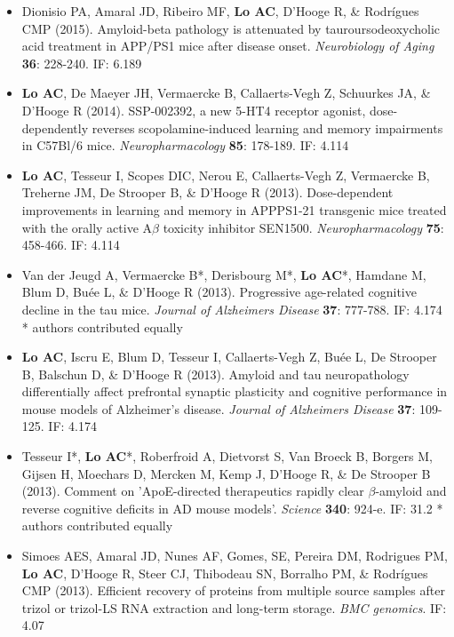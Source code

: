 \documentclass{article}
\begin{document}
\begin{itemize}
    \item Dionisio PA, Amaral JD, Ribeiro MF, \textbf{Lo AC}, D'Hooge R, \& Rodr\'{i}gues CMP (2015). Amyloid-beta pathology is attenuated by tauroursodeoxycholic acid treatment in APP/PS1 mice after disease onset. \emph{Neurobiology of Aging} \textbf{36}: 228-240. IF: 6.189
    
    \item \textbf{Lo AC}, De Maeyer JH, Vermaercke B, Callaerts-Vegh Z, Schuurkes JA, \& D'Hooge R (2014). SSP-002392, a new 5-HT4 receptor agonist, dose-dependently reverses scopolamine-induced learning and memory impairments in C57Bl/6 mice. \emph{Neuropharmacology} \textbf{85}: 178-189. IF: 4.114
    
    \item \textbf{Lo AC}, Tesseur I, Scopes DIC, Nerou E, Callaerts-Vegh Z, Vermaercke B, Treherne JM, De Strooper B, \& D'Hooge R (2013). Dose-dependent improvements in learning and memory in APPPS1-21 transgenic mice treated with the orally active A$\beta$  toxicity inhibitor SEN1500. \emph{Neuropharmacology} \textbf{75}: 458-466. IF: 4.114
    
    \item Van der Jeugd A, Vermaercke B*, Derisbourg M*, \textbf{Lo AC}*, Hamdane M, Blum D, Bu\'{e}e L, \& D'Hooge R (2013). Progressive age-related cognitive decline in the tau mice. \emph{Journal of Alzheimers Disease} \textbf{37}: 777-788. IF: 4.174 * authors contributed equally
    
    \item \textbf{Lo AC}, Iscru E, Blum D, Tesseur I, Callaerts-Vegh Z, Bu\'{e}e L, De Strooper B, Balschun D, \& D'Hooge R (2013). Amyloid and tau neuropathology differentially affect prefrontal synaptic plasticity and cognitive performance in mouse models of Alzheimer's disease. \emph{Journal of Alzheimers Disease} \textbf{37}: 109-125. IF: 4.174
    
    \item Tesseur I*, \textbf{Lo AC}*, Roberfroid A, Dietvorst S, Van Broeck B, Borgers M, Gijsen H, Moechars D, Mercken M, Kemp J, D'Hooge R, \& De Strooper B (2013). Comment on 'ApoE-directed therapeutics rapidly clear $\beta$-amyloid and reverse cognitive deficits in AD mouse models'. \emph{Science} \textbf{340}: 924-e. IF: 31.2 * authors contributed equally
    
    \item Simoes AES, Amaral JD, Nunes AF, Gomes, SE, Pereira DM, Rodrigues PM, \textbf{Lo AC}, D'Hooge R, Steer CJ, Thibodeau SN, Borralho PM, \& Rodr\'{i}gues CMP (2013). Efficient recovery of proteins from multiple source samples after trizol or trizol-LS RNA extraction and long-term storage. \emph{BMC genomics}. IF: 4.07
    

\end{itemize}
\end{document}
